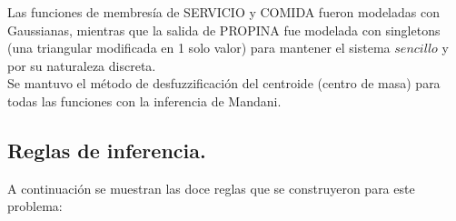 \documentclass[11pt, letterpaper]{article}
\begin{document}
Las funciones de membresía de SERVICIO y COMIDA fueron modeladas con Gaussianas, mientras que la salida de PROPINA fue modelada con singletons (una triangular modificada en 1 solo valor) para mantener el sistema $sencillo$ y por su naturaleza discreta. \\

Se mantuvo el método de desfuzzificación del centroide (centro de masa) para todas las funciones con la inferencia de Mandani.\\

\newpage

\subsection{Reglas de inferencia.}

A continuación se muestran las doce reglas que se construyeron para este problema:
\end{document}
